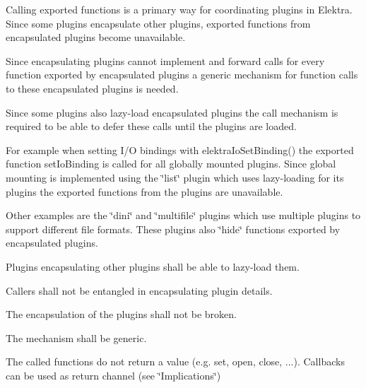 Calling exported functions is a primary way for coordinating plugins in Elektra. Since some plugins encapsulate other plugins, exported functions from encapsulated plugins become unavailable.

Since encapsulating plugins cannot implement and forward calls for every function exported by encapsulated plugins a generic mechanism for function calls to these encapsulated plugins is needed.

Since some plugins also lazy-\/load encapsulated plugins the call mechanism is required to be able to defer these calls until the plugins are loaded.

For example when setting I/O bindings with {\ttfamily elektra\+Io\+Set\+Binding()} the exported function {\ttfamily set\+Io\+Binding} is called for all globally mounted plugins. Since global mounting is implemented using the \char`\"{}list\char`\"{} plugin which uses lazy-\/loading for its plugins the exported functions from the plugins are unavailable.

Other examples are the \char`\"{}dini\char`\"{} and \char`\"{}multifile\char`\"{} plugins which use multiple plugins to support different file formats. These plugins also \char`\"{}hide\char`\"{} functions exported by encapsulated plugins.


\begin{DoxyEnumerate}
\item Plugins encapsulating other plugins shall be able to lazy-\/load them.
\item Callers shall not be entangled in encapsulating plugin details.
\item The encapsulation of the plugins shall not be broken.
\item The mechanism shall be generic.
\end{DoxyEnumerate}


\begin{DoxyEnumerate}
\item The called functions do not return a value (e.\+g. {\ttfamily set}, {\ttfamily open}, {\ttfamily close}, ...). Callbacks can be used as return channel (see \char`\"{}\+Implications\char`\"{})
\end{DoxyEnumerate}


